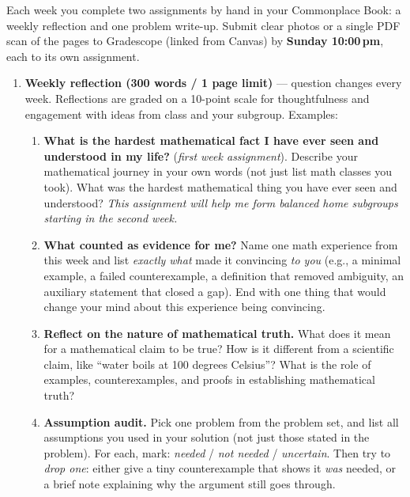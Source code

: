 \documentclass[oneside,11pt]{amsart}
\begin{document}
Each week you complete two assignments by hand in your Commonplace Book:
a weekly reflection and one problem write-up.
Submit clear photos or a single PDF scan of the pages to
Gradescope (linked from Canvas) by \textbf{Sunday 10:00\,pm},
each to its own assignment.

\begin{enumerate}[(1)]
  \item
	\textbf{Weekly reflection (300 words / 1 page limit)} --- question changes
	every week. Reflections are graded on a 10-point scale for thoughtfulness
	and engagement with ideas from class and your subgroup. Examples:
	\begin{enumerate}
	\item
		\textbf{What is the hardest mathematical fact I have ever seen and understood
		in my life?}
		(\emph{first week assignment}).
		Describe your mathematical journey in your own words (not just list
		math classes you took). What was the hardest mathematical thing you
		have ever seen and understood?
		\emph{This assignment will help me form balanced home subgroups starting in the second week.}
	\item
		\textbf{What counted as evidence for me?}
		Name one math experience from this week
		and list \emph{exactly what} made it convincing \emph{to
		you} (e.g., a minimal example, a failed counterexample, a
		definition that removed ambiguity, an auxiliary statement
		that closed a gap).
		End with one thing that would change your mind about
		this experience being convincing.
	\item \textbf{Reflect on the nature of mathematical truth.}
		What does it mean for a mathematical claim to be true?
		How is it different from a scientific claim, like
		``water boils at 100 degrees Celsius''?
		What is the role of examples, counterexamples, and proofs
		in establishing mathematical truth?
	\item \textbf{Assumption audit.}
            Pick one problem from the problem set, and list all
            assumptions you used in your solution
            (not just those stated in the problem). For each, mark:
            \emph{needed} / \emph{not needed} / \emph{uncertain}. Then
            try to \emph{drop one}: either give a tiny counterexample
            that shows it \emph{was} needed, or a brief note
            explaining why the argument still goes through.
	\end{enumerate}


\end{enumerate}
\end{document}
